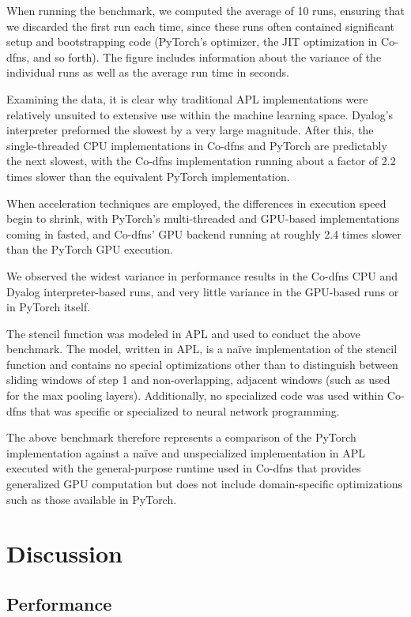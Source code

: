 \documentclass[10pt,twocolumn,english,format=sigplan,screen,balance]{acmart}
\begin{document}
When running the benchmark, we computed the average of 10 runs, ensuring
that we discarded the first run each time, since these runs often
contained significant setup and bootstrapping code (PyTorch's optimizer,
the JIT optimization in Co-dfns, and so forth). The figure includes
information about the variance of the individual runs as well as the
average run time in seconds. 

Examining the data, it is clear why traditional APL implementations
were relatively unsuited to extensive use within the machine learning
space. Dyalog's interpreter preformed the slowest by a very large
magnitude. After this, the single-threaded CPU implementations in
Co-dfns and PyTorch are predictably the next slowest, with the Co-dfns
implementation running about a factor of 2.2 times slower than the
equivalent PyTorch implementation.

When acceleration techniques are employed, the differences in execution
speed begin to shrink, with PyTorch's multi-threaded and GPU-based
implementations coming in fasted, and Co-dfns' GPU backend running
at roughly 2.4 times slower than the PyTorch GPU execution. 

We observed the widest variance in performance results in the Co-dfns
CPU and Dyalog interpreter-based runs, and very little variance in
the GPU-based runs or in PyTorch itself. 

The stencil function was modeled in APL and used to conduct the above
benchmark. The model, written in APL, is a naïve implementation of
the stencil function and contains no special optimizations other than
to distinguish between sliding windows of step 1 and non-overlapping,
adjacent windows (such as used for the max pooling layers). Additionally,
no specialized code was used within Co-dfns that was specific or specialized
to neural network programming. 

The above benchmark therefore represents a comparison of the PyTorch
implementation against a naïve and unspecialized implementation in
APL executed with the general-purpose runtime used in Co-dfns that
provides generalized GPU computation but does not include domain-specific
optimizations such as those available in PyTorch. 

\section{Discussion}

\subsection{Performance}
\end{document}
